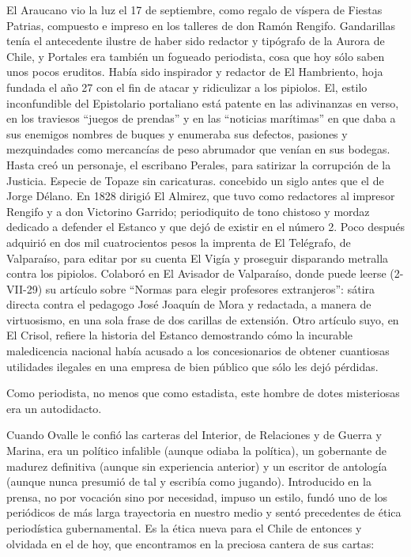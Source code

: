 \documentclass[10pt,twoside,openright]{memoir}
\begin{document}
El Araucano vio la luz el 17 de septiembre, como
regalo de víspera de Fiestas
Patrias, compuesto e impreso en los talleres de don Ramón Rengifo.
Gandarillas tenía el antecedente ilustre de haber sido redactor y
tipógrafo de la Aurora de Chile, y Portales era también un fogueado
periodista, cosa que hoy sólo saben
unos pocos eruditos. Había sido inspirador y redactor de El Hambriento,
hoja fundada el año 27 con el fin de atacar y ridiculizar a los
pipiolos. El, estilo inconfundible
del Epistolario portaliano está patente en las adivinanzas en verso, en
los traviesos ``juegos de prendas'' y en las ``noticias marítimas'' en
que daba a sus enemigos nombres de buques y enumeraba sus defectos,
pasiones y mezquindades como mercancías de peso abrumador que venían en
sus bodegas. Hasta creó un personaje, el escribano Perales, para
satirizar la corrupción de la Justicia. Especie de Topaze sin
caricaturas. concebido un siglo antes que el de Jorge Délano. En 1828
dirigió El Almirez, que tuvo como redactores al impresor Rengifo y a don
Victorino Garrido; periodiquito de tono chistoso y mordaz dedicado a
defender el Estanco y que dejó de existir en el número 2. Poco después
adquirió en dos mil cuatrocientos pesos la imprenta de El Telégrafo, de
Valparaíso, para editar por su cuenta El Vigía y proseguir disparando
metralla contra los pipiolos. Colaboró en El Avisador de Valparaíso,
donde puede leerse (2-VII-29) su artículo sobre ``Normas para elegir
profesores extranjeros'': sátira directa contra el pedagogo José Joaquín
de Mora y redactada, a manera de virtuosismo, en una sola frase de dos
carillas de extensión. Otro artículo suyo, en El Crisol, refiere la
historia del Estanco demostrando cómo la incurable maledicencia nacional
había acusado a los concesionarios de obtener cuantiosas utilidades
ilegales en una empresa de bien público que sólo les dejó pérdidas.

Como periodista, no menos que como estadista, este hombre de dotes
misteriosas era un autodidacto.

Cuando Ovalle le confió las carteras del Interior, de Relaciones y de
Guerra y Marina, era un político infalible (aunque odiaba la política),
un gobernante de madurez definitiva (aunque sin experiencia anterior) y
un escritor de antología (aunque nunca presumió de tal y escribía como
jugando). Introducido en la prensa, no por vocación sino por necesidad,
impuso un estilo, fundó uno de los periódicos de más larga trayectoria
en nuestro medio y sentó precedentes de
ética periodística gubernamental. Es
la ética nueva para el Chile de entonces y olvidada en el de hoy, que
encontramos en la preciosa cantera de sus
cartas:
\end{document}
